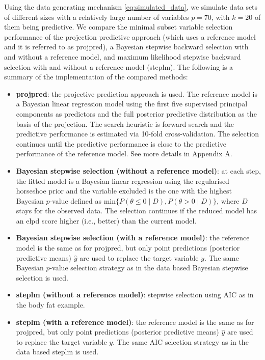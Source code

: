 \documentclass[a4]{article}
\theoremstyle{definition}
\begin{document}
Using the data generating mechanism \eqref{eq:simulated_data}, we
simulate data sets of different sizes with a relatively large number
of variables $p=70$, with $k=20$ of them being predictive.  We compare
the minimal subset variable selection performance of the projection
predictive approach (which uses a reference model and it is referred to as projpred), 
a Bayesian stepwise
backward selection with and without a reference model, and maximum
likelihood stepwise backward selection with and without a reference
model (steplm). The following is a summary of the implementation of the compared methods:
\begin{itemize}
\item \textbf{projpred}: the projective prediction approach is used. 
  The reference model is a Bayesian linear regression
  model using the first five supervised principal components \citep{piironen2018} as predictors
  and the full posterior predictive distribution as the basis of the projection.   
  The search heuristic  is forward search and the predictive performance 
  is estimated via 10-fold cross-validation. The selection continues
  until the predictive performance is close to the predictive
  performance of the reference model. See more details in Appendix A.
  
\item \textbf{Bayesian stepwise selection (without a reference model)}: at each step, the fitted model
 is a Bayesian linear regression using the regularised horseshoe
  prior and the variable excluded is the one with the highest Bayesian
  $p$-value defined as $\text{min}\{P(\theta\leq0 \; | \; D),P(\theta>0 \; | \; D)\}$,
  where $D$ stays for the observed data.
The selection continues if the reduced model has an elpd score higher 
(i.e., better) than the current model.

\item \textbf{Bayesian stepwise selection (with a reference model)}: the reference model is the same as for projpred, but only point predictions (posterior predictive means) $\hat{y}$ are used to replace the target variable $y$. The same Bayesian
  $p$-value selection strategy as in the data based Bayesian stepwise selection is used.

\item \textbf{steplm (without a reference model)}: stepwise selection using AIC as in the body fat example.

\item \textbf{steplm (with a reference model)}: the reference model is the same as for
 projpred, but only point predictions (posterior predictive means) $\hat{y}$ 
 are used to replace the target variable $y$. The same AIC selection strategy 
 as in the data based steplm is used.

\end{itemize}
\end{document}
